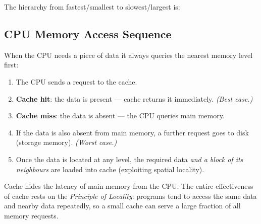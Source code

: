 \documentclass[11pt, a4paper, notitlepage]{report}
\theoremstyle{definition}
\theoremstyle{remark}
\theoremstyle{definition}
\begin{document}
The hierarchy from fastest/smallest to slowest/largest is:

\begin{center}
\end{center}

\subsection{CPU Memory Access Sequence}
\label{sec:cpu-access}

When the CPU needs a piece of data it always queries the nearest memory level first:

\begin{enumerate}
  \item The CPU sends a request to the cache.
  \item \textbf{Cache hit}: the data is present — cache returns it immediately. \emph{(Best case.)}
  \item \textbf{Cache miss}: the data is absent — the CPU queries main memory.
  \item If the data is also absent from main memory, a further request goes to disk (storage memory). \emph{(Worst case.)}
  \item Once the data is located at any level, the required data \emph{and a block of its neighbours} are loaded into cache (exploiting spatial locality).
\end{enumerate}

\begin{keyresult}[title={Key Result: Cache as a Buffer}]
  Cache hides the latency of main memory from the CPU. The entire effectiveness of cache rests on the \emph{Principle of Locality}: programs tend to access the same data and nearby data repeatedly, so a small cache can serve a large fraction of all memory requests.
\end{keyresult}
\end{document}

